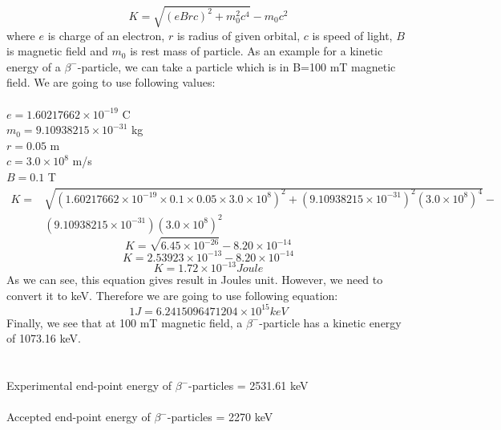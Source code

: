 \documentclass[a4paper,12pt]{article}
\begin{document}
\begin{equation}
K=\sqrt{(eBrc)^{2}+m_{0}^{2}c^{4}}-m_{0}c^{2}
\end{equation} 
where $e$ is charge of an electron, $r$ is radius of given orbital, $c$ is speed of light, $B$ is magnetic field and $m_{0}$ is rest mass of particle. As an example for a kinetic energy of a $\beta^{-}$-particle, we can take a particle which is in B=100 mT magnetic field. We are going to use following values:\\\\
\textbullet \space $e=1.60217662\times10^{-19}$ C\\
\textbullet \space $m_{0}=9.10938215\times10^{-31}$ kg\\
\textbullet \space $r=0.05$ m\\
\textbullet \space $c=3.0\times10^{8}$ m/s\\
\textbullet \space $B=0.1$ T
\begin{equation}
\begin{split}
K=&\sqrt{(1.60217662\times10^{-19}\times 0.1\times 0.05 \times 3.0\times10^{8})^{2}+(9.10938215\times10^{-31})^2(3.0\times10^{8})^{4}}-\\  
& (9.10938215\times10^{-31})(3.0\times10^{8})^{2}
\end{split}
\end{equation}
\begin{equation}
K=\sqrt{6.45\times10^{-26}}-8.20\times 10^{-14}
\end{equation}
\begin{equation}
K=2.53923\times 10^{-13}-8.20\times 10^{-14}
\end{equation}
\begin{equation}
	K=1.72 \times 10^{-13} Joule
\end{equation}
As we can see, this equation gives result in Joules unit. However, we need to convert it to keV. Therefore we are going to use following equation:
\begin{equation}
	1 J = 6.2415096471204 \times 10^{15} keV
\end{equation}
Finally, we see that at 100 mT magnetic field, a $\beta^{-}$-particle has a kinetic energy of 1073.16 keV.\\\\\\
Experimental end-point energy of $\beta^{-}$-particles = 2531.61 keV\\\\
Accepted end-point energy of $\beta^{-}$-particles = 2270 keV\\\\
\end{document}
